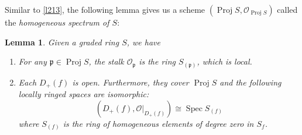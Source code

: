 \documentclass[12pt]{article}
\newtheorem{lemma}{Lemma}[subsection]
\theoremstyle{remark}
\newcommand{\Spec}[0]{\operatorname{Spec}}
\newcommand{\Proj}[0]{\operatorname{Proj}}
\begin{document}
	Similar to \autoref{l213}, the following lemma gives us a scheme $(\Proj S, \mathscr O_{\Proj S})$ called the \textit{homogeneous spectrum of $S$}:
	\begin{lemma}\label{l271}
		Given a graded ring $S$, we have
		\begin{enumerate}[\normalfont(a)]
			\item For any $\mathfrak p\in\Proj S$, the stalk $\mathscr O_{\mathfrak p}$ is the ring $S_{(\mathfrak p)}$, which is local.
			\item Each $D_+(f)$ is open. Furthermore, they cover $\Proj S$ and the following locally ringed spaces are isomorphic:
				\[\left(D_+(f), \mathscr O|_{D_+(f)}\right)\cong\Spec S_{(f)}\]
			where $S_{(f)}$ is the ring of homogeneous elements of degree zero in $S_f$.
		\end{enumerate}
	\end{lemma}
\end{document}
